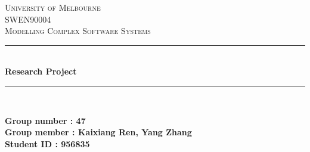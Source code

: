 \begin{titlepage}

\newcommand{\HRule}{\rule{\linewidth}{0.5mm}} %

\center %
 

\textsc{\LARGE University of Melbourne}\\[1.5cm] %
\textsc{\Large SWEN90004}\\[0.5cm] %
\textsc{\large Modelling Complex Software Systems}\\[0.5cm] %


\HRule \\[0.4cm]
{ \huge \bfseries Research Project}\\[0.4cm] %
\HRule \\[1.5cm]


\begin{minipage}{0.4\textwidth}
	\bfseries Group number : 47\\
	\bfseries Group member : Kaixiang Ren, Yang Zhang\\
	\bfseries Student ID : 956835
\end{minipage}\\[2cm]




\end{titlepage}
